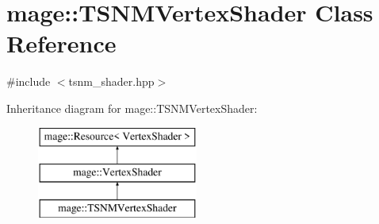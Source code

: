 \hypertarget{classmage_1_1_t_s_n_m_vertex_shader}{}\section{mage\+:\+:T\+S\+N\+M\+Vertex\+Shader Class Reference}
\label{classmage_1_1_t_s_n_m_vertex_shader}


{\ttfamily \#include $<$tsnm\+\_\+shader.\+hpp$>$}

Inheritance diagram for mage\+:\+:T\+S\+N\+M\+Vertex\+Shader\+:\begin{figure}[H]
\begin{center}
\leavevmode
\includegraphics[height=3.000000cm]{classmage_1_1_t_s_n_m_vertex_shader}
\end{center}
\end{figure}
